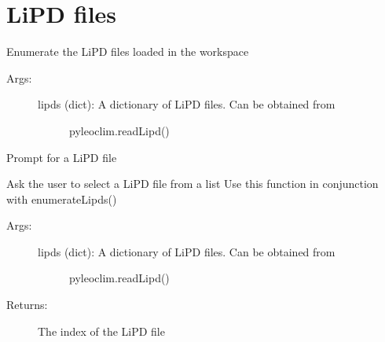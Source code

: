 \documentclass[letterpaper,10pt,english]{sphinxmanual}
\begin{document}
\section{LiPD files}
\label{\detokenize{LIPDutils:lipd-files}}

\begin{fulllineitems}
\label{\detokenize{LIPDutils:pyleoclim.LipdUtils.enumerateLipds}}
Enumerate the LiPD files loaded in the workspace
\begin{description}
\item[{Args:}] \leavevmode\begin{description}
\item[{lipds (dict): A dictionary of LiPD files. Can be obtained from}] \leavevmode
pyleoclim.readLipd()

\end{description}

\end{description}

\end{fulllineitems}


\begin{fulllineitems}
\label{\detokenize{LIPDutils:pyleoclim.LipdUtils.getLipd}}
Prompt for a LiPD file

Ask the user to select a LiPD file from a list
Use this function in conjunction with enumerateLipds()
\begin{description}
\item[{Args:}] \leavevmode\begin{description}
\item[{lipds (dict): A dictionary of LiPD files. Can be obtained from}] \leavevmode
pyleoclim.readLipd()

\end{description}

\item[{Returns:}] \leavevmode
The index of the LiPD file

\end{description}

\end{fulllineitems}
\end{document}

